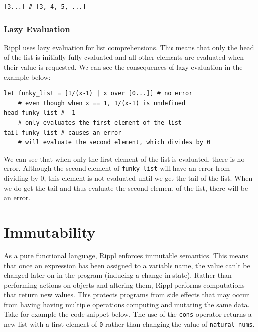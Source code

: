 \documentclass[5pt]{article}
\begin{document}
\begin{lstlisting}[language=rippl]
[3...] # [3, 4, 5, ...]
\end{lstlisting}

\subsubsection{Lazy Evaluation}
\noindent Rippl uses lazy evaluation for list comprehensions. This means that only the head of the list is initially fully evaluated and all other elements are evaluated when their value is requested. We can see the consequences of lazy evaluation in the example below: \\

\begin{lstlisting}[language=rippl]
let funky_list = [1/(x-1) | x over [0...]] # no error
    # even though when x == 1, 1/(x-1) is undefined
head funky_list # -1 
    # only evaluates the first element of the list
tail funky_list # causes an error
    # will evaluate the second element, which divides by 0
\end{lstlisting}

We can see that when only the first element of the list is evaluated, there is no error. Although the second element of \texttt{funky\_list} will have an error from dividing by 0, this element is not evaluated until we get the tail of the list. When we do get the tail and thus evaluate the second element of the list, there will be an error. \\

\section{Immutability}
As a pure functional language, Rippl enforces immutable semantics. This means that once an expression has been assigned to a variable name, the value can't be changed later on in the program (inducing a change in state). Rather than performing actions on objects and altering them, Rippl performs computations that return new values. This protects programs from side effects that may occur from having having multiple operations computing and mutating the same data. \\

Take for example the code snippet below. The use of the \texttt{cons} operator returns a new list with a first element of \texttt{0} rather than changing the value of \texttt{natural\_nums}. \\
\end{document}
